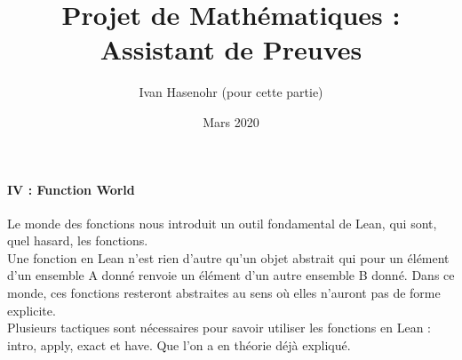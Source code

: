 \documentclass[french,frenchkw]{article}
\title{Projet de Mathématiques : Assistant de Preuves}
\author{Ivan Hasenohr (pour cette partie)}
\date{Mars 2020}
\begin{document}
\maketitle

\paragraph{IV : Function World}
Le monde des fonctions nous introduit un outil fondamental de Lean, qui sont, quel hasard, les fonctions. \\
Une fonction en Lean n'est rien d'autre qu'un objet abstrait qui pour un élément d'un ensemble A donné renvoie un élément d'un autre ensemble B donné. Dans ce monde, ces fonctions resteront abstraites au sens où elles n'auront pas de forme explicite. \\
Plusieurs tactiques sont nécessaires pour savoir utiliser les fonctions en Lean : intro, apply, exact et have. Que l'on a en théorie déjà expliqué.\\
\end{document}
